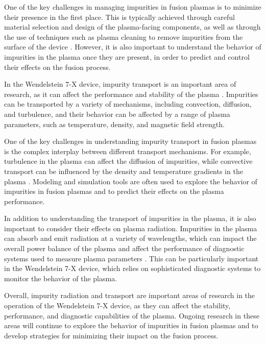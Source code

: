 \documentclass[12pt]{article}
\begin{document}
One of the key challenges in managing impurities in fusion plasmas is to minimize their presence in the first place. This is typically achieved through careful material selection and design of the plasma-facing components, as well as through the use of techniques such as plasma cleaning to remove impurities from the surface of the device \cite{w7x-impurity-management}. However, it is also important to understand the behavior of impurities in the plasma once they are present, in order to predict and control their effects on the fusion process.

In the Wendelstein 7-X device, impurity transport is an important area of research, as it can affect the performance and stability of the plasma \cite{w7x-impurity-transport}. Impurities can be transported by a variety of mechanisms, including convection, diffusion, and turbulence, and their behavior can be affected by a range of plasma parameters, such as temperature, density, and magnetic field strength.

One of the key challenges in understanding impurity transport in fusion plasmas is the complex interplay between different transport mechanisms. For example, turbulence in the plasma can affect the diffusion of impurities, while convective transport can be influenced by the density and temperature gradients in the plasma \cite{w7x-impurity-transport-review}. Modeling and simulation tools are often used to explore the behavior of impurities in fusion plasmas and to predict their effects on the plasma performance.

In addition to understanding the transport of impurities in the plasma, it is also important to consider their effects on plasma radiation. Impurities in the plasma can absorb and emit radiation at a variety of wavelengths, which can impact the overall power balance of the plasma and affect the performance of diagnostic systems used to measure plasma parameters \cite{w7x-impurity-radiation}. This can be particularly important in the Wendelstein 7-X device, which relies on sophisticated diagnostic systems to monitor the behavior of the plasma.

Overall, impurity radiation and transport are important areas of research in the operation of the Wendelstein 7-X device, as they can affect the stability, performance, and diagnostic capabilities of the plasma. Ongoing research in these areas will continue to explore the behavior of impurities in fusion plasmas and to develop strategies for minimizing their impact on the fusion process.
\end{document}
